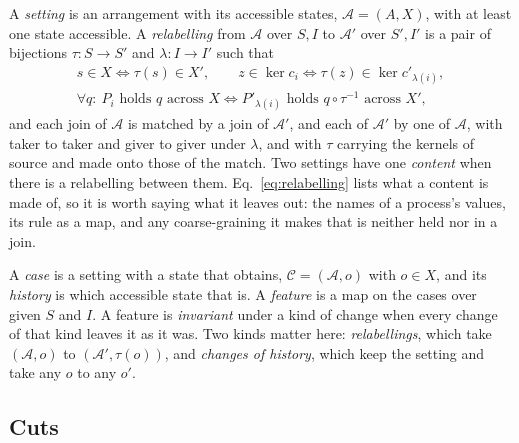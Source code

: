 \documentclass[11pt]{amsart}
\newcommand{\Set}{\mathcal{A}}
\newcommand{\Case}{\mathcal{C}}
\theoremstyle{plain}
\begin{document}
A \emph{setting} is an arrangement with its accessible states, $\Set=(A,X)$, with at least one state accessible. A \emph{relabelling} from $\Set$ over $S,I$ to $\Set'$ over $S',I'$ is a pair of bijections $\tau:S\to S'$ and $\lambda:I\to I'$ such that
\begin{equation}\label{eq:relabelling}
  \begin{gathered}
  s\in X\iff\tau(s)\in X',\qquad z\in\ker c_i\iff\tau(z)\in\ker c'_{\lambda(i)},\\
  \forall q:\ P_i\text{ holds }q\text{ across }X\iff P'_{\lambda(i)}\text{ holds }q\circ\tau^{-1}\text{ across }X',
  \end{gathered}
\end{equation}
and each join of $\Set$ is matched by a join of $\Set'$, and each of $\Set'$ by one of $\Set$, with taker to taker and giver to giver under $\lambda$, and with $\tau$ carrying the kernels of source and made onto those of the match. Two settings have one \emph{content} when there is a relabelling between them. Eq.~\eqref{eq:relabelling} lists what a content is made of, so it is worth saying what it leaves out: the names of a process's values, its rule as a map, and any coarse-graining it makes that is neither held nor in a join.

A \emph{case} is a setting with a state that obtains, $\Case=(\Set,o)$ with $o\in X$, and its \emph{history} is which accessible state that is. A \emph{feature} is a map on the cases over given $S$ and $I$. A feature is \emph{invariant} under a kind of change when every change of that kind leaves it as it was. Two kinds matter here: \emph{relabellings}, which take $(\Set,o)$ to $(\Set',\tau(o))$, and \emph{changes of history}, which keep the setting and take any $o$ to any $o'$.

\subsection{Cuts}
\end{document}
